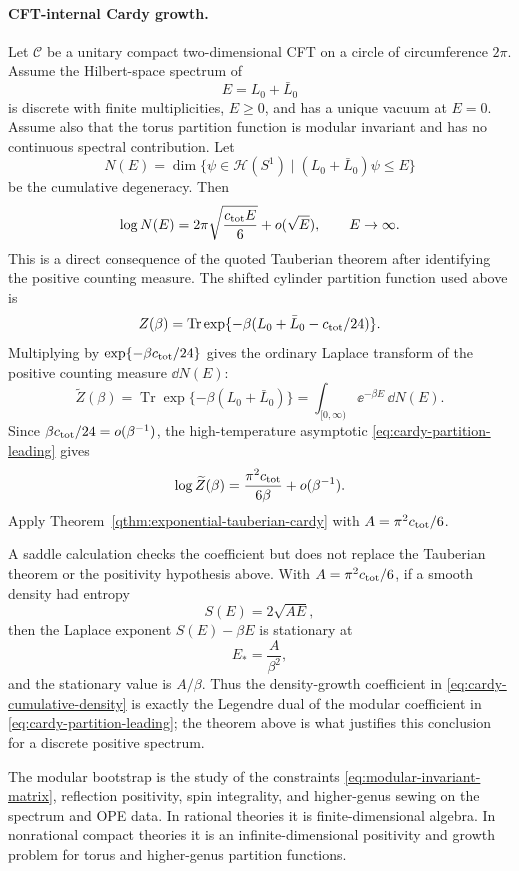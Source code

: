 \paragraph{CFT-internal Cardy growth.}
Let \(\mathcal C\) be a unitary compact two-dimensional CFT on a circle of
circumference \(2\pi\).  Assume the Hilbert-space spectrum of
\[
  E=L_0+\bar L_0
\]
is discrete with finite multiplicities, \(E\ge0\), and has a unique vacuum at
\(E=0\).  Assume also that the torus partition function is modular invariant
and has no continuous spectral contribution.  Let
\[
  N(E)=\dim\{\psi\in\mathcal H(S^1)\mid
  (L_0+\bar L_0)\psi\le E\}
\]
be the cumulative degeneracy.  Then
\begin{equation}
  \log N(E)
  =
  2\pi\sqrt{\frac{c_{\rm tot}E}{6}}+o(\sqrt E),
  \qquad
  E\to\infty .
  \label{eq:cardy-cumulative-density}
\end{equation}
This is a direct consequence of the quoted Tauberian theorem after identifying
the positive counting measure.  The shifted cylinder partition function used
above is
\[
  Z(\beta)
  =
  \operatorname{Tr}\exp\{-\beta(L_0+\bar L_0-c_{\rm tot}/24)\}.
\]
Multiplying by \(\exp\{-\beta c_{\rm tot}/24\}\) gives the ordinary Laplace
transform of the positive counting measure \(\dd N(E)\):
\[
  \widetilde Z(\beta)
  =
  \operatorname{Tr}\exp\{-\beta(L_0+\bar L_0)\}
  =
  \int_{[0,\infty)}\ee^{-\beta E}\,\dd N(E).
\]
Since \(\beta c_{\rm tot}/24=o(\beta^{-1})\), the high-temperature asymptotic
\eqref{eq:cardy-partition-leading} gives
\[
  \log \widetilde Z(\beta)
  =
  \frac{\pi^2c_{\rm tot}}{6\beta}+o(\beta^{-1}).
\]
Apply Theorem~\ref{qthm:exponential-tauberian-cardy} with
\(A=\pi^2c_{\rm tot}/6\).

A saddle calculation checks the coefficient but does not replace the
Tauberian theorem or the positivity hypothesis above.  With
\(A=\pi^2c_{\rm tot}/6\), if a smooth density had entropy
\[
  S(E)=2\sqrt{AE},
\]
then the Laplace exponent \(S(E)-\beta E\) is stationary at
\[
  E_\ast=\frac A{\beta^2},
\]
and the stationary value is \(A/\beta\).  Thus the density-growth coefficient
in \eqref{eq:cardy-cumulative-density} is exactly the Legendre dual of the
modular coefficient in \eqref{eq:cardy-partition-leading}; the theorem above
is what justifies this conclusion for a discrete positive spectrum.

The modular bootstrap is the study of the constraints
\eqref{eq:modular-invariant-matrix}, reflection positivity, spin integrality,
and higher-genus sewing on the spectrum and OPE data.  In rational theories it
is finite-dimensional algebra.  In nonrational compact theories it is an
infinite-dimensional positivity and growth problem for torus and higher-genus
partition functions.

